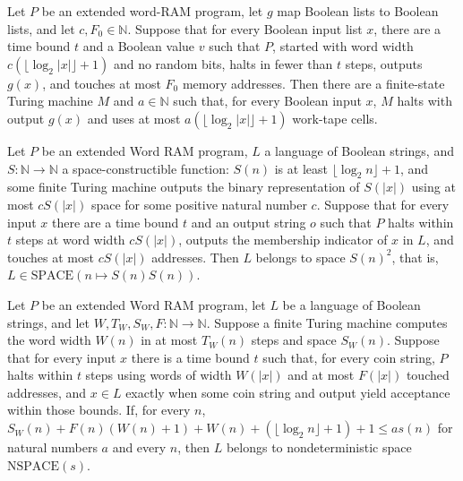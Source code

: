 \begin{theorem}
\label{WordRAM.computesInSpace_of_computes}
\leanok
{}
Let $P$ be an extended word-RAM program, let $g$ map Boolean lists to Boolean lists, and
let $c,F_0\in\mathbb{N}$. Suppose that for every Boolean input list $x$, there are a
time bound $t$ and a Boolean value $v$ such that $P$, started with word width
$c(\lfloor\log_2 |x|\rfloor+1)$ and no random bits, halts in fewer than $t$ steps,
outputs $g(x)$, and touches at most $F_0$ memory addresses. Then there are a
finite-state Turing machine $M$ and $a\in\mathbb{N}$ such that, for every Boolean input
$x$, $M$ halts with output $g(x)$ and uses at most $a(\lfloor\log_2 |x|\rfloor+1)$
work-tape cells.
\end{theorem}

\begin{theorem}
\label{WordRAM.mem_SPACE_mul_of_decides}
\leanok
{}
Let $P$ be an extended Word RAM program, $L$ a language of Boolean strings, and
$S:\mathbb{N}\to\mathbb{N}$ a space-constructible function: $S(n)$ is at least
$\lfloor\log_2 n\rfloor+1$, and some finite Turing machine outputs the binary
representation of $S(|x|)$ using at most $cS(|x|)$ space for some positive natural
number $c$. Suppose that for every input $x$ there are a time bound $t$ and an output
string $o$ such that $P$ halts within $t$ steps at word width $cS(|x|)$, outputs the
membership indicator of $x$ in $L$, and touches at most $cS(|x|)$ addresses. Then $L$
belongs to space $S(n)^2$, that is, $L\in\mathrm{SPACE}(n\mapsto S(n)S(n))$.
\end{theorem}

\begin{theorem}
\label{WordRAM.mem_NSPACE_of_accepts}
\leanok
{}
Let $P$ be an extended Word RAM program, let $L$ be a language of Boolean strings, and
let $W,T_W,S_W,F:\mathbb{N}\to\mathbb{N}$. Suppose a finite Turing machine computes the
word width $W(n)$ in at most $T_W(n)$ steps and space $S_W(n)$. Suppose that for every
input $x$ there is a time bound $t$ such that, for every coin string, $P$ halts within
$t$ steps using words of width $W(|x|)$ and at most $F(|x|)$ touched addresses, and
$x\in L$ exactly when some coin string and output yield acceptance within those bounds.
If, for every $n$, $S_W(n)+F(n)(W(n)+1)+W(n)+(\lfloor\log_2 n\rfloor+1)+1\le a s(n)$ for
natural numbers $a$ and every $n$, then $L$ belongs to nondeterministic space
$\mathrm{NSPACE}(s)$.
\end{theorem}

